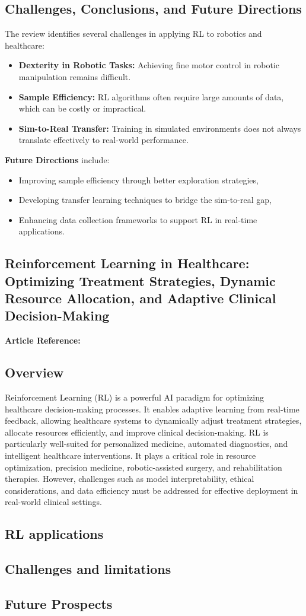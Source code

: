 \subsection*{Challenges, Conclusions, and Future Directions}
The review identifies several challenges in applying RL to robotics and healthcare:
\begin{itemize}
    \item \textbf{Dexterity in Robotic Tasks:} Achieving fine motor control in robotic manipulation remains difficult.
    \item \textbf{Sample Efficiency:} RL algorithms often require large amounts of data, which can be costly or impractical.
    \item \textbf{Sim-to-Real Transfer:} Training in simulated environments does not always translate effectively to real-world performance.
\end{itemize}

\noindent\textbf{Future Directions} include:
\begin{itemize}
    \item Improving sample efficiency through better exploration strategies,
    \item Developing transfer learning techniques to bridge the sim-to-real gap,
    \item Enhancing data collection frameworks to support RL in real-time applications.
\end{itemize}
\newpage

\subsection{Reinforcement Learning in Healthcare: Optimizing Treatment Strategies, Dynamic Resource Allocation, and Adaptive Clinical Decision-Making}
\textbf{Article Reference:} \cite{article_3}

\subsection*{Overview}
Reinforcement Learning (RL) is a powerful AI paradigm for optimizing healthcare decision-making processes. It enables adaptive learning from real-time feedback, allowing healthcare systems to dynamically adjust treatment strategies, allocate resources efficiently, and improve clinical decision-making. RL is particularly well-suited for personalized medicine, automated diagnostics, and intelligent healthcare interventions. It plays a critical role in resource optimization, precision medicine, robotic-assisted surgery, and rehabilitation therapies. However, challenges such as model interpretability, ethical considerations, and data efficiency must be addressed for effective deployment in real-world clinical settings.
\subsection{RL applications}

\subsection{Challenges and limitations}
\subsection{Future Prospects} 
